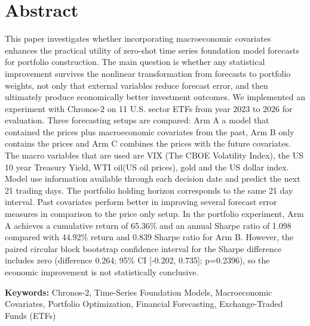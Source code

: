 \documentclass[12pt,a4paper,twoside,openany]{book}
\begin{document}
\chapter*{Abstract}
This paper investigates whether incorporating macroeconomic covariates enhances the practical utility of zero-shot time series foundation model forecasts for portfolio construction. The main question is whether any statistical improvement survives the nonlinear transformation from forecasts to portfolio weights, not only that external variables reduce forecast error, and then ultimately produce economically better investment outcomes. We implemented an experiment with Chronos-2 on 11 U.S. sector ETFs from year 2023 to 2026 for evaluation. Three forecasting setups are compared: Arm A a model that contained the prices plus macroeconomic covariates from the past, Arm B only contains the prices and Arm C combines the prices with the future covariates. The macro variables that are used are VIX (The CBOE Volatility Index), the US 10 year Treasury Yield, WTI oil(US oil prices), gold and the US dollar index. Model use information available through each decision date and predict the next 21 trading days. The portfolio holding horizon corresponds to the same 21 day interval. Past covariates perform better in improving several forecast error measures in comparison to the price only setup. In the portfolio experiment, Arm A achieves a cumulative return of 65.36\% and an annual Sharpe ratio of 1.098 compared with 44.92\% return and 0.839 Sharpe ratio for Arm B. However, the paired circular block bootstrap confidence interval for the Sharpe difference includes zero (difference 0.264; 95\% CI [-0.202, 0.735]; p=0.2396), so the economic improvement is not statistically conclusive.

\noindent\textbf{Keywords:} Chronos-2, Time-Series Foundation Models,
Macroeconomic Covariates, Portfolio Optimization, Financial Forecasting,
Exchange-Traded Funds (ETFs)
\end{document}
